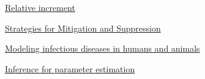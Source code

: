 \href{https://www.researchgate.net/publication/340606620_Modelling_and_Forecasting_The_Number_of_Confirmed_Cases_and_Deaths_from_COVID-19_Pandemic_in_USA
}{Relative increment}

\href{https://www.imperial.ac.uk/media/imperial-college/medicine/mrc-gida/2020-03-26-COVID19-Report-12.pdf}{Strategies for
Mitigation and Suppression
}

\href{https://onlinelibrary.wiley.com/doi/abs/10.1111/j.1541-0420.2008.01082_7.x}{Modeling infectious diseases in humans and animals}

\href{https://kingaa.github.io/clim-dis/parest/parest.html
}{Inference for parameter
estimation
}